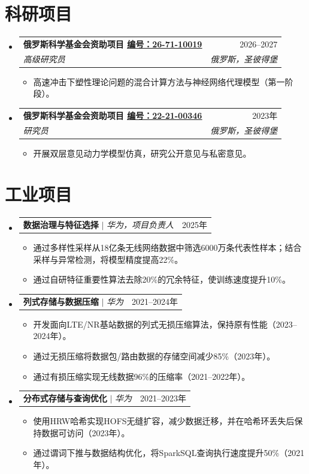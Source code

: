 \documentclass[letterpaper,10pt,fontset=none]{ctexart}
\makeatletter
\newcommand{\link}[2]{\href{#1}{\color{blue}\underline{#2}}}
\newcommand{\resumeItem}[1]{
  \item\small{
    {#1 \vspace{-2pt}}
  }
}
\newcommand{\resumeSubheading}[4]{
  \vspace{-2pt}\item
  \begin{tabular*}{0.97\textwidth}[t]{l@{\extracolsep{\fill}}r}
    \textbf{#1} & #2 \\
    \textit{\small#3} & \textit{\small #4} \\
  \end{tabular*}\vspace{-7pt}
}
\newcommand{\resumeProjectHeading}[2]{
  \item
  \begin{tabular*}{0.97\textwidth}{l@{\extracolsep{\fill}}r}
    \small#1 & #2 \\
  \end{tabular*}\vspace{-7pt}
}
\newenvironment{resumeSubHeadingList}{\begin{itemize}[leftmargin=0.15in, label={}]}{\end{itemize}}
\newenvironment{resumeItemList}{\begin{itemize}}{\end{itemize}}
\makeatother
\begin{document}
\section{科研项目}
\begin{resumeSubHeadingList}
  \resumeSubheading
    {俄罗斯科学基金会资助项目 \link{https://rscf.ru/project/26-71-10019/}{编号：26-71-10019}}{2026--2027}
    {高级研究员}{俄罗斯，圣彼得堡}
    \begin{resumeItemList}
      \resumeItem{高速冲击下塑性理论问题的混合计算方法与神经网络代理模型（第一阶段）。}
    \end{resumeItemList}
  \resumeSubheading
    {俄罗斯科学基金会资助项目 \link{https://rscf.ru/en/project/22-21-00346/}{编号：22-21-00346}}{2023年}
    {研究员}{俄罗斯，圣彼得堡}
    \begin{resumeItemList}
      \resumeItem{开展双层意见动力学模型仿真，研究公开意见与私密意见。}
    \end{resumeItemList}
\end{resumeSubHeadingList}

\section{工业项目}
\begin{resumeSubHeadingList}
  \resumeProjectHeading{
    \textbf{数据治理与特征选择} $|$ \emph{华为，项目负责人}}{2025年}
  \begin{resumeItemList}
    \resumeItem{通过多样性采样从18亿条无线网络数据中筛选6000万条代表性样本；结合采样与异常检测，将模型精度提高22\%。}
    \resumeItem{通过自研特征重要性算法去除20\%的冗余特征，使训练速度提升10\%。}
  \end{resumeItemList}
  \resumeProjectHeading{
    \textbf{列式存储与数据压缩} $|$ \emph{华为}}{2021--2024年}
  \begin{resumeItemList}
    \resumeItem{开发面向LTE/NR基站数据的列式无损压缩算法，保持原有性能（2023--2024年）。}
    \resumeItem{通过无损压缩将数据包/路由数据的存储空间减少85\%（2023年）。}
    \resumeItem{通过有损压缩实现无线数据96\%的压缩率（2021--2022年）。}
  \end{resumeItemList}
  \resumeProjectHeading{
    \textbf{分布式存储与查询优化} $|$ \emph{华为}}{2021--2023年}
  \begin{resumeItemList}
    \resumeItem{使用HRW哈希实现HOFS无缝扩容，减少数据迁移，并在哈希环丢失后保持数据可访问（2023年）。}
    \resumeItem{通过谓词下推与数据结构优化，将SparkSQL查询执行速度提升50\%（2021年）。}
  \end{resumeItemList}
\end{resumeSubHeadingList}
\end{document}

